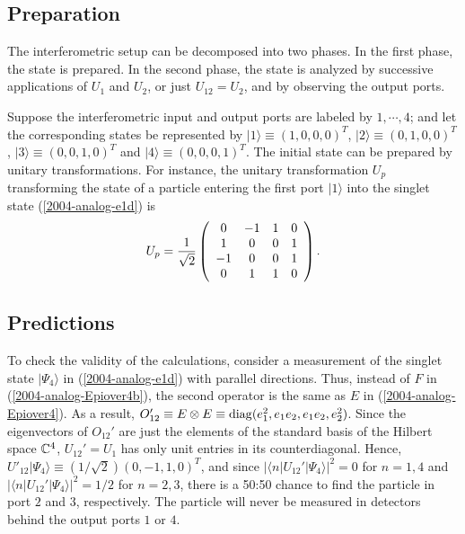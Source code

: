 \documentclass[12pt]{iopart}
\begin{document}
\subsection{Preparation}
The interferometric setup can be decomposed into two phases.
In the first phase, the state is prepared.
In the second phase, the state is analyzed by successive applications
of $U_1$ and $U_2$, or just $U_{12}=U_2$, and by observing the output ports.

Suppose the interferometric input and output
ports are labeled by $1,\cdots ,4$; and let the corresponding  states
be represented by
$\vert 1\rangle \equiv (1,0,0,0)^T$,
$\vert 2\rangle \equiv (0,1,0,0)^T$,
$\vert 3\rangle \equiv (0,0,1,0)^T$
and
$\vert 4\rangle \equiv (0,0,0,1)^T$.
The initial state can be prepared by unitary transformations.
For instance, the unitary transformation $U_p$ transforming
the state of a particle entering the first port
$\vert 1\rangle $
into the singlet state
(\ref{2004-analog-e1d})
is
\begin{equation}
U_p = {1\over  \sqrt{2}}
\left(
\begin{array}{cccc}
0& -1& 1& 0\\
1& 0& 0& 1\\
-1& 0& 0& 1    \\
0& 1& 1& 0
\end{array}
\right)
.        \label{2004-analog-eprep2}
\end{equation}

\subsection{Predictions}


To check the validity of the calculations, consider a measurement
of the singlet state $\vert \Psi_4\rangle$ in (\ref{2004-analog-e1d}) with parallel directions.
Thus, instead of $F$ in
(\ref{2004-analog-Epiover4b}),
the second operator is the same as $E$ in
(\ref{2004-analog-Epiover4}).
As a result,
$O_{12}' \equiv E \otimes E \equiv {\rm diag}(e_1^2,e_1e_2,e_1e_2,e_2^2)$.
Since the eigenvectors of $O_{12}'$ are just the elements
of the standard basis of the Hilbert space
${\Bbb C}^4$,
$U_{12}'=U_1$ has only unit entries in its counterdiagonal.
Hence,
$U'_{12}\vert \Psi_4\rangle \equiv (1/\sqrt{2})(0,-1,1,0)^T$,
and since
$\vert \langle n \vert U_{12}'\vert \Psi_4\rangle \vert^2 =0$ for
$n=1,4$ and
$\vert \langle n \vert U_{12}'\vert \Psi_4\rangle \vert^2 =1/2$ for
$n=2,3$,
there is a 50:50 chance to find the particle in port $2$ and $3$,
respectively.
The particle will never be measured in detectors behind the output ports
$1$ or $4$.
\end{document}
